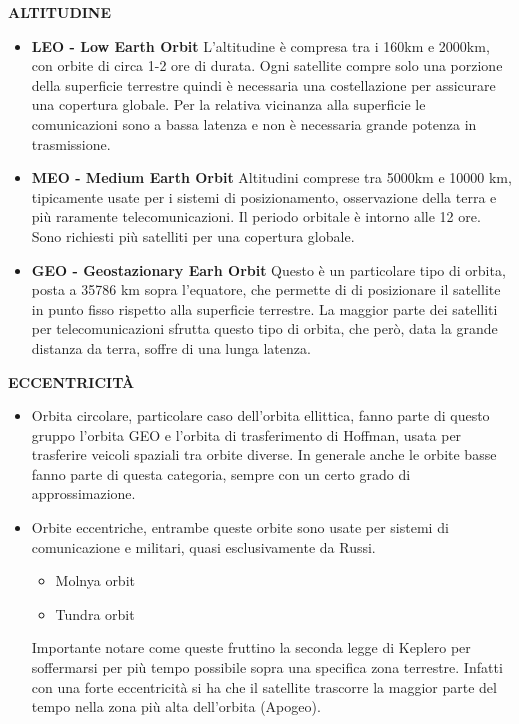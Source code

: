 \documentclass[a4paper]{article}
\begin{document}
			{\large \bf ALTITUDINE}
			\begin{itemize}
				\item {\bf LEO - Low Earth Orbit}
				L'altitudine è compresa tra i 160km e 2000km, con orbite di circa 1-2 ore di durata. Ogni satellite compre solo una porzione della superficie terrestre quindi è necessaria una costellazione per assicurare una copertura globale. Per la relativa vicinanza alla superficie le comunicazioni sono a bassa latenza e non è necessaria grande potenza in trasmissione.
				\item {\bf MEO - Medium Earth Orbit}
				Altitudini comprese tra 5000km e 10000 km, tipicamente usate per i sistemi di posizionamento, osservazione della terra e più raramente telecomunicazioni. Il periodo orbitale è intorno alle 12 ore. Sono richiesti più satelliti per una copertura globale.				
				\item {\bf GEO - Geostazionary Earh Orbit}
				Questo è un particolare tipo di orbita, posta a 35786 km sopra l'equatore, che permette di di posizionare il satellite in punto fisso rispetto alla superficie terrestre. La maggior parte dei satelliti per telecomunicazioni sfrutta questo tipo di orbita, che però, data la grande distanza da terra, soffre di una lunga latenza.
			\end{itemize}
			
			{\large \bf ECCENTRICITÀ}	
			\begin{itemize}
				\item Orbita circolare, particolare caso dell'orbita ellittica, fanno parte di questo gruppo l'orbita GEO e l'orbita di trasferimento di Hoffman, usata per trasferire veicoli spaziali tra orbite diverse. In generale anche le orbite basse fanno parte di questa categoria, sempre con un certo grado di approssimazione.
				\item Orbite eccentriche, entrambe queste orbite sono usate per sistemi di comunicazione e militari, quasi esclusivamente da Russi. \begin{itemize}
					\item Molnya orbit
					\item Tundra orbit					
				\end{itemize}
				Importante notare come queste fruttino la seconda legge di Keplero per soffermarsi per più tempo possibile sopra una specifica zona terrestre. Infatti con una forte eccentricità si ha che il satellite trascorre la maggior parte del tempo nella zona più alta dell'orbita (Apogeo). 								
			\end{itemize}
			
\end{document}
